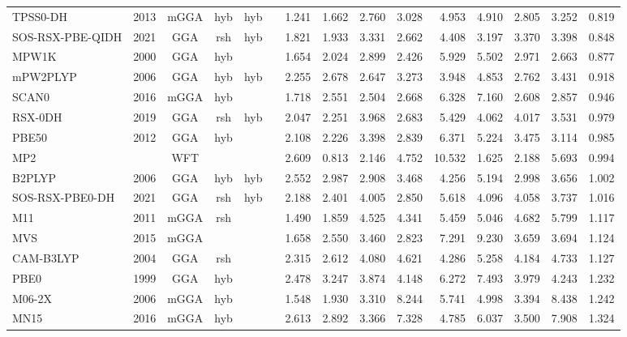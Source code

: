 \begin{landscape}
\begin{longtable}[c]{lcccccrrrrrrrrc}
TPSS0-DH         & 2013 & mGGA & hyb & hyb &     & 1.241 & 1.662 & 2.760  & 3.028  & 4.953  & 4.910  & 2.805  & 3.252  & 0.819 \\
SOS-RSX-PBE-QIDH & 2021 & GGA  & rsh & hyb &     & 1.821 & 1.933 & 3.331  & 2.662  & 4.408  & 3.197  & 3.370  & 3.398  & 0.848 \\
MPW1K            & 2000 & GGA  & hyb &     &     & 1.654 & 2.024 & 2.899  & 2.426  & 5.929  & 5.502  & 2.971  & 2.663  & 0.877 \\
mPW2PLYP         & 2006 & GGA  & hyb & hyb &     & 2.255 & 2.678 & 2.647  & 3.273  & 3.948  & 4.853  & 2.762  & 3.431  & 0.918 \\
SCAN0            & 2016 & mGGA & hyb &     &     & 1.718 & 2.551 & 2.504  & 2.668  & 6.328  & 7.160  & 2.608  & 2.857  & 0.946 \\
RSX-0DH          & 2019 & GGA  & rsh & hyb &     & 2.047 & 2.251 & 3.968  & 2.683  & 5.429  & 4.062  & 4.017  & 3.531  & 0.979 \\
PBE50            & 2012 & GGA  & hyb &     &     & 2.108 & 2.226 & 3.398  & 2.839  & 6.371  & 5.224  & 3.475  & 3.114  & 0.985 \\
MP2              &      & WFT  &     &     &     & 2.609 & 0.813 & 2.146  & 4.752  & 10.532 & 1.625  & 2.188  & 5.693  & 0.994 \\
B2PLYP           & 2006 & GGA  & hyb & hyb &     & 2.552 & 2.987 & 2.908  & 3.468  & 4.256  & 5.194  & 2.998  & 3.656  & 1.002 \\
SOS-RSX-PBE0-DH  & 2021 & GGA  & rsh & hyb &     & 2.188 & 2.401 & 4.005  & 2.850  & 5.618  & 4.096  & 4.058  & 3.737  & 1.016 \\
M11              & 2011 & mGGA & rsh &     &     & 1.490 & 1.859 & 4.525  & 4.341  & 5.459  & 5.046  & 4.682  & 5.799  & 1.117 \\
MVS              & 2015 & mGGA &     &     &     & 1.658 & 2.550 & 3.460  & 2.823  & 7.291  & 9.230  & 3.659  & 3.694  & 1.124 \\
CAM-B3LYP        & 2004 & GGA  & rsh &     &     & 2.315 & 2.612 & 4.080  & 4.621  & 4.286  & 5.258  & 4.184  & 4.733  & 1.127 \\
PBE0             & 1999 & GGA  & hyb &     &     & 2.478 & 3.247 & 3.874  & 4.148  & 6.272  & 7.493  & 3.979  & 4.243  & 1.232 \\
M06-2X           & 2006 & mGGA & hyb &     &     & 1.548 & 1.930 & 3.310  & 8.244  & 5.741  & 4.998  & 3.394  & 8.438  & 1.242 \\
MN15             & 2016 & mGGA & hyb &     &     & 2.613 & 2.892 & 3.366  & 7.328  & 4.785  & 6.037  & 3.500  & 7.908  & 1.324 \\

\end{longtable}
\end{landscape}
